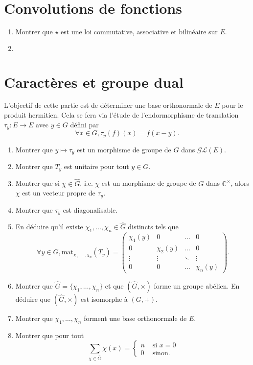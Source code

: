 \documentclass{article}[a4paper]
\newcommand{\C}{\mathbb{C}}
\begin{document}
\section{Convolutions de fonctions}
\begin{enumerate}
    \item Montrer que \(\star\) est une loi commutative, associative et bilinéaire sur \(E\).
    \item 
\end{enumerate}
\section{Caractères et groupe dual}
L'objectif de cette partie est de déterminer une base orthonormale de \(E\) pour le produit hermitien.
Cela se fera via l'étude de l'endormorphisme de translation \(\tau_y : E\to E\) avec \(y\in G\) défini par
\begin{equation*}
    \forall x\in G, \tau_y(f)(x) = f(x-y).
\end{equation*}
\begin{enumerate}
    \item Montrer que \(y\mapsto \tau_y\) est un morphisme de groupe de \(G\) dans \(\mathcal{GL}(E)\).
    \item Montrer que \(T_y\) est unitaire pour tout \(y\in G\).
    \item Montrer que si \(\chi \in \widehat{G}\), i.e. \(\chi\) est un morphisme de groupe de \(G\) dans \(\C^\times\), 
    alors \(\chi\) est un vecteur propre de \(\tau_y\).
    \item Montrer que \(\tau_y\) est diagonalisable.
    \item En déduire qu'il existe \(\chi_1,\dots,\chi_n\in \widehat{G}\) distincts tels que 
    \begin{equation*}
        \forall y\in G, \mathrm{mat}_{\chi_1,\dots, \chi_n}(T_y) = \begin{pmatrix}
            \chi_1(y) & 0 & \dots & 0\\
            0 & \chi_2(y) & \dots & 0\\
            \vdots & \vdots & \ddots & \vdots\\
            0 & 0 & \dots & \chi_n(y)
        \end{pmatrix}.
    \end{equation*}
    \item Montrer que \(\widehat{G} = \{\chi_1,\dots,\chi_n\}\) et que 
    \((\widehat{G},\times)\) forme un groupe abélien. En déduire que 
    \((\widehat{G},\times)\) est isomorphe à \((G,+)\).
    \item Montrer que \(\chi_1,\dots,\chi_n\) forment une base orthonormale de \(E\).
    \item Montrer que pour tout 
    \begin{equation*}
        \sum_{\chi \in \widehat{G}} \chi(x) = \begin{cases}
            n & \text{ si } x = 0\\
            0 & \text{ sinon}.
        \end{cases}
    \end{equation*}
\end{enumerate}
\end{document}
